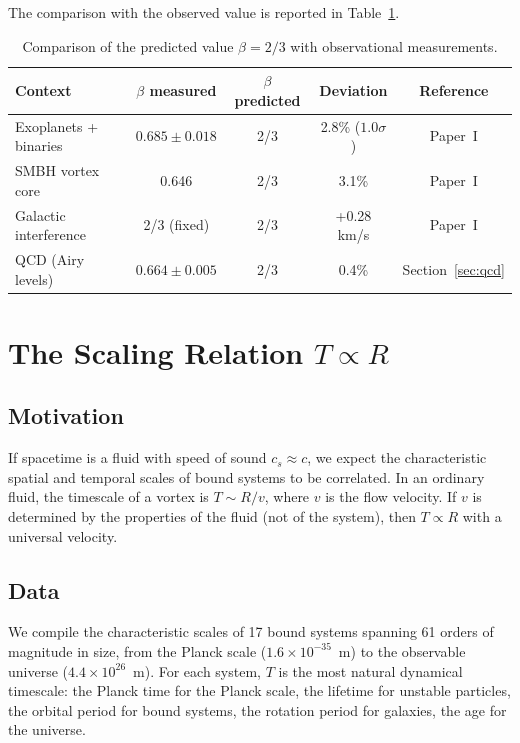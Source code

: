 \documentclass[10pt,a4paper]{article}
\begin{document}
The comparison with the observed value is reported in Table~\ref{tab:beta_obs}.

\begin{table}[h]
\centering
\caption{Comparison of the predicted value $\beta = 2/3$ with observational measurements.}\label{tab:beta_obs}
\begin{tabular}{lcccc}
\toprule
Context & $\beta$ measured & $\beta$ predicted & Deviation & Reference \\
\midrule
Exoplanets + binaries & $0.685 \pm 0.018$ & 2/3 & 2.8\% ($1.0\sigma$) & Paper~I \\
SMBH vortex core & 0.646 & 2/3 & 3.1\% & Paper~I \\
Galactic interference & 2/3 (fixed) & 2/3 & +0.28 km/s & Paper~I \\
QCD (Airy levels) & $0.664 \pm 0.005$ & 2/3 & 0.4\% & Section~\ref{sec:qcd} \\
\bottomrule
\end{tabular}
\end{table}


\section{The Scaling Relation $T \propto R$}\label{sec:TR}

\subsection{Motivation}

If spacetime is a fluid with speed of sound $c_s \approx c$, we expect the characteristic spatial and temporal scales of bound systems to be correlated. In an ordinary fluid, the timescale of a vortex is $T \sim R/v$, where $v$ is the flow velocity. If $v$ is determined by the properties of the fluid (not of the system), then $T \propto R$ with a universal velocity.

\subsection{Data}

We compile the characteristic scales of 17 bound systems spanning 61 orders of magnitude in size, from the Planck scale ($1.6 \times 10^{-35}$~m) to the observable universe ($4.4 \times 10^{26}$~m). For each system, $T$ is the most natural dynamical timescale: the Planck time for the Planck scale, the lifetime for unstable particles, the orbital period for bound systems, the rotation period for galaxies, the age for the universe.
\end{document}
